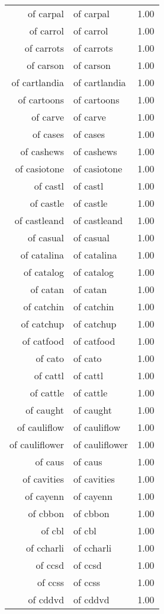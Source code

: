 \begin{table}[ht]
\begin{tabular}{rlr}
  of carpal & of carpal & 1.00 \\ 
  of carrol & of carrol & 1.00 \\ 
  of carrots & of carrots & 1.00 \\ 
  of carson & of carson & 1.00 \\ 
  of cartlandia & of cartlandia & 1.00 \\ 
  of cartoons & of cartoons & 1.00 \\ 
  of carve & of carve & 1.00 \\ 
  of cases & of cases & 1.00 \\ 
  of cashews & of cashews & 1.00 \\ 
  of casiotone & of casiotone & 1.00 \\ 
  of castl & of castl & 1.00 \\ 
  of castle & of castle & 1.00 \\ 
  of castleand & of castleand & 1.00 \\ 
  of casual & of casual & 1.00 \\ 
  of catalina & of catalina & 1.00 \\ 
  of catalog & of catalog & 1.00 \\ 
  of catan & of catan & 1.00 \\ 
  of catchin & of catchin & 1.00 \\ 
  of catchup & of catchup & 1.00 \\ 
  of catfood & of catfood & 1.00 \\ 
  of cato & of cato & 1.00 \\ 
  of cattl & of cattl & 1.00 \\ 
  of cattle & of cattle & 1.00 \\ 
  of caught & of caught & 1.00 \\ 
  of cauliflow & of cauliflow & 1.00 \\ 
  of cauliflower & of cauliflower & 1.00 \\ 
  of caus & of caus & 1.00 \\ 
  of cavities & of cavities & 1.00 \\ 
  of cayenn & of cayenn & 1.00 \\ 
  of cbbon & of cbbon & 1.00 \\ 
  of cbl & of cbl & 1.00 \\ 
  of ccharli & of ccharli & 1.00 \\ 
  of ccsd & of ccsd & 1.00 \\ 
  of ccss & of ccss & 1.00 \\ 
  of cddvd & of cddvd & 1.00 \\ 

\end{tabular}
\end{table}
